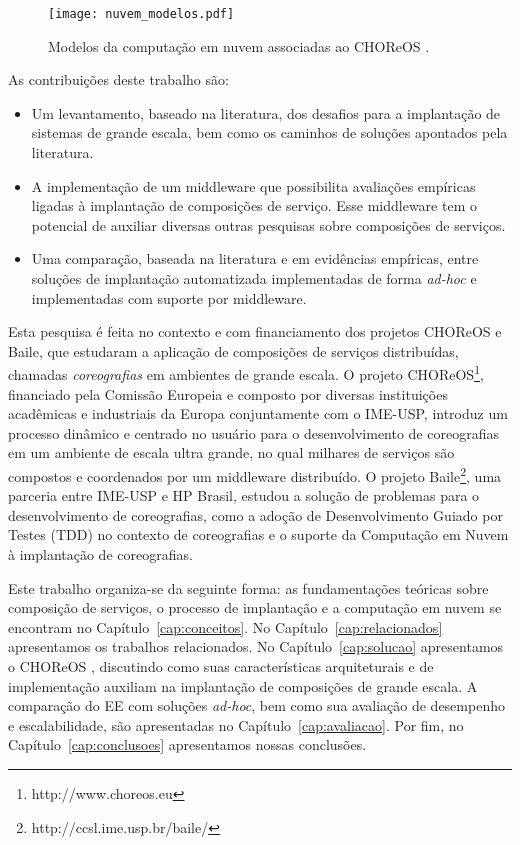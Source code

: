 \begin{figure}[!h]
  \centering
  \texttt{[image: nuvem\_modelos.pdf]} 
  \caption{Modelos da computação em nuvem associadas ao CHOReOS \ee.}
  \label{fig:modelos_nuvem} 
\end{figure}

As contribuições deste trabalho são: 

\begin{itemize}
\item Um levantamento, baseado na literatura, dos desafios para a implantação de sistemas de grande escala, bem como os caminhos de soluções apontados pela literatura.
\item A implementação de um middleware que possibilita avaliações empíricas ligadas à implantação de composições de serviço. Esse middleware tem o potencial de auxiliar diversas outras pesquisas sobre composições de serviços.
\item Uma comparação, baseada na literatura e em evidências empíricas, entre soluções de implantação automatizada implementadas de forma \emph{ad-hoc} e implementadas com suporte por middleware.
\end{itemize}

Esta pesquisa é feita no contexto e com financiamento dos projetos CHOReOS e Baile, que estudaram a aplicação de composições de serviços distribuídas, chamadas \emph{coreografias} em ambientes de grande escala. O projeto CHOReOS\footnote{http://www.choreos.eu}, financiado pela Comissão Europeia e composto por diversas instituições acadêmicas e industriais da Europa conjuntamente com o IME-USP, introduz um processo dinâmico e centrado no usuário para o desenvolvimento de coreografias em um ambiente de escala ultra grande, no qual milhares de serviços são compostos e coordenados por um middleware distribuído. O projeto Baile\footnote{http://ccsl.ime.usp.br/baile/}, uma parceria entre IME-USP e HP Brasil, estudou a solução de problemas para o desenvolvimento de coreografias, como a adoção de Desenvolvimento Guiado por Testes (TDD) no contexto de coreografias e o suporte da Computação em Nuvem à implantação de coreografias.

Este trabalho organiza-se da seguinte forma: as fundamentações teóricas sobre composição de serviços, o processo de implantação e a computação em nuvem se encontram no Capítulo~\ref{cap:conceitos}. No Capítulo~\ref{cap:relacionados} apresentamos os trabalhos relacionados. No Capítulo~\ref{cap:solucao} apresentamos o CHOReOS \ee, discutindo como suas características arquiteturais e de implementação auxiliam na implantação de composições de grande escala. A comparação do EE com soluções \emph{ad-hoc}, bem como sua avaliação de desempenho e escalabilidade, são apresentadas no Capítulo~\ref{cap:avaliacao}. Por fim, no Capítulo~\ref{cap:conclusoes} apresentamos nossas conclusões.

